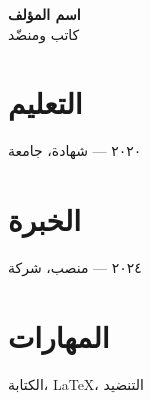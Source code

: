 \documentclass[11pt]{article}
\begin{document}
{\Large\bfseries اسم المؤلف}\\[4pt]
{\large كاتب ومنضّد}

\vspace{8pt}

\section*{التعليم}
٢٠٢٠ — شهادة، جامعة

\section*{الخبرة}
٢٠٢٤ — منصب، شركة

\section*{المهارات}
الكتابة، LaTeX، التنضيد
\end{document}
